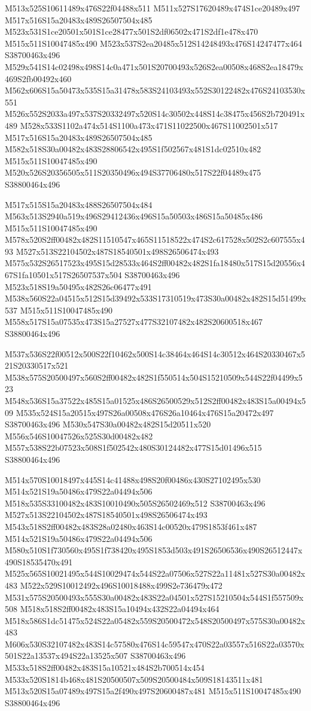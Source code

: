 \documentclass{article}
\begin{document}
\begin{multicols}{2}
M513x525S10611489x476S22f04488x511 M511x527S17620489x474S1ce20489x497 M517x516S15a20483x489S26507504x485 M523x531S1ce20501x501S1ce28477x501S2df06502x471S2df1e478x470 M515x511S10047485x490 M523x537S2ea20485x512S14248493x476S14247477x464 S38700463x496 M529x541S14c02498x498S14c0a471x501S20700493x526S2ea00508x468S2ea18479x469S2fb00492x460 M562x606S15a50473x535S15a31478x583S24103493x552S30122482x476S24103530x551 M526x552S2033a497x537S20332497x520S14c30502x448S14c38475x456S2b720491x489 M528x533S1102a474x514S1100a473x471S11022500x467S11002501x517 M517x516S15a20483x489S26507504x485 M582x518S30a00482x483S28806542x495S1f502567x481S1dc02510x482 M515x511S10047485x490 M520x526S20356505x511S20350496x494S37706480x517S22f04489x475 S38800464x496

M517x515S15a20483x488S26507504x484 M563x513S2940a519x496S29412436x496S15a50503x486S15a50485x486 M515x511S10047485x490 M578x520S2ff00482x482S11510547x465S11518522x474S2c617528x502S2c607555x493 M527x513S22104502x487S18540501x498S26506474x493 M575x532S26517523x495S15d28533x464S2ff00482x482S1fa18480x517S15d20556x467S1fa10501x517S26507537x504 S38700463x496 M523x518S19a50495x482S26c06477x491 M538x560S22a04515x512S15d39492x533S17310519x473S30a00482x482S15d51499x537 M515x511S10047485x490 M558x517S15a07535x473S15a27527x477S32107482x482S20600518x467 S38800464x496 

M537x536S22f00512x500S22f10462x500S14c38464x464S14c30512x464S20330467x521S20330517x521 M538x575S20500497x560S2ff00482x482S1f550514x504S15210509x544S22f04499x523 M548x536S15a37522x485S15a01525x486S26500529x512S2ff00482x483S15a00494x509 M535x524S15a20515x497S26a00508x476S26a10464x476S15a20472x497 S38700463x496 M530x547S30a00482x482S15d20511x520 M556x546S10047526x525S30d00482x482 M557x538S22b07523x508S1f502542x480S30124482x477S15d01496x515 S38800464x496 

M514x570S10018497x445S14c41488x498S20f00486x430S27102495x530 M514x521S19a50486x479S22a04494x506 M518x535S33100482x483S10010490x505S26502469x512 S38700463x496 M527x513S22104502x487S18540501x498S26506474x493 M543x518S2ff00482x483S28a02480x463S14c00520x479S1853f461x487 M514x521S19a50486x479S22a04494x506 M580x510S1f730560x495S1f738420x495S1853d503x491S26506536x490S26512447x490S18535470x491 M525x565S10021495x544S10029474x544S22a07506x527S22a11481x527S30a00482x483 M522x529S10012492x496S10018488x499S2e736479x472 M531x575S20500493x555S30a00482x483S22a04501x527S15210504x544S1f557509x508 M518x518S2ff00482x483S15a10494x432S22a04494x464 M518x586S1dc51475x524S22a05482x559S20500472x548S20500497x575S30a00482x483 M606x530S32107482x483S14c57580x476S14c59547x470S22a03557x516S22a03570x501S22a13537x494S22a13525x507 S38700463x496 M533x518S2ff00482x483S15a10521x484S2b700514x454 M533x520S1814b468x481S20500507x509S20500484x509S18143511x481 M513x520S15a07489x497S15a2f490x497S20600487x481 M515x511S10047485x490 S38800464x496


\end{multicols}
\end{document}
